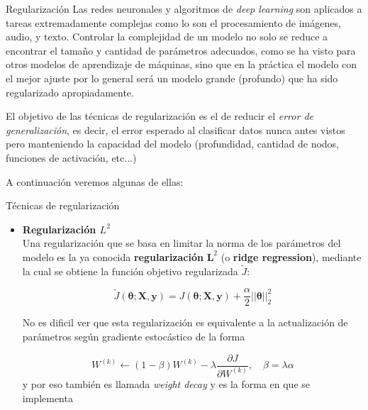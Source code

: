 \documentclass[handout, 9pt]{beamer}
\begin{document}
\begin{frame}{Regularización}
Las redes neuronales y algoritmos de \textit{deep learning} son aplicados a tareas extremadamente complejas como lo son el procesamiento de imágenes, audio, y texto. Controlar la complejidad de un modelo no solo se reduce a encontrar el tamaño y cantidad de parámetros adecuados, como se ha visto para otros modelos de aprendizaje de máquinas, sino que en la práctica el modelo con el mejor ajuste por lo general será un modelo grande (profundo) que ha sido regularizado apropiadamente. \pause 

El objetivo de las técnicas de regularización es el de reducir el \textit{error de generalización}, es decir, el error esperado al clasificar datos nunca antes vistos pero manteniendo la capacidad del modelo (profundidad, cantidad de nodos, funciones de activación, etc...) \pause 

A continuación veremos algunas de ellas: 


\end{frame}


\begin{frame}{Técnicas de regularización}

\begin{itemize}
  \item \textbf{Regularización $L^2$} \\ \pause
  Una regularización que se basa en limitar la norma de los parámetros del modelo es la ya conocida \textbf{regularización} $\bm{L}^{2}$ (o \textbf{ridge regression}), mediante la cual se obtiene la función objetivo regularizada $\tilde{J}$: \pause

  \begin{equation*}
  \tilde{J}(\bm{\theta};\bm{X},\bm{y}) = J(\bm{\theta};\bm{X},\bm{y}) + \frac{\alpha}{2}||\bm{\theta}||^{2}_{2}
  \end{equation*} \pause

  No es dificil ver que esta regularización es equivalente a la actualización de parámetros según gradiente estocástico de la forma \pause

  \begin{equation*}
  W^{(k)} \gets (1-\beta) W^{(k)} - \lambda \frac{\partial J}{\partial W^{(k)}}, \quad \beta = \lambda \alpha
  \end{equation*}
  y por eso también es llamada \textit{weight decay} y es la forma en que se implementa

\end{itemize}

\end{frame}
\end{document}
